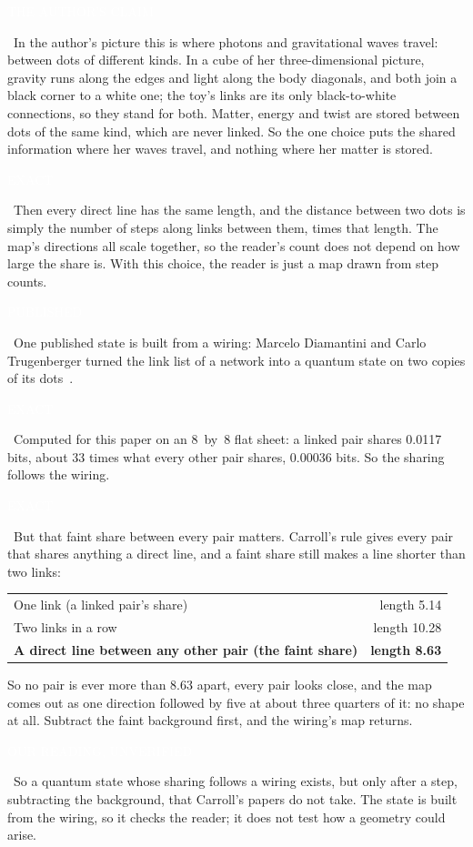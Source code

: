 \documentclass[11pt,letterpaper]{article}
\newcommand{\sub}[1]{\par\medskip{\color{ink}\large\bfseries #1}\par}
\newcommand{\tagbox}[2]{{\sffamily\scriptsize\colorbox{#1}{\textcolor{white}{\strut #2}}}}
\newcommand{\Exact}{\tagbox{kExact}{EXACT}}
\newcommand{\Pub}{\tagbox{kPub}{PUBLISHED}}
\newcommand{\Ours}{\tagbox{kOurs}{OUR READING, UNVERIFIED}}
\newcommand{\Claim}{\tagbox{kClaim}{THE AUTHOR'S CLAIM}}
\begin{document}
\Claim\ In the author's picture this is where photons and gravitational waves travel: between dots of different
kinds. In a cube of her three-dimensional picture, gravity runs along the edges and light along the body diagonals,
and both join a black corner to a white one; the toy's links are its only black-to-white connections, so they stand
for both. Matter, energy and twist are stored between dots of the same kind, which are never linked. So the one
choice puts the shared information where her waves travel, and nothing where her matter is stored.

\Exact\ Then every direct line has the same length, and the distance between two dots is simply the
number of steps along links between them, times that length. The map's directions all scale together,
so the reader's count does not depend on how large the share is. With this choice, the reader is just
a map drawn from step counts.

\sub{Does a quantum state like that exist?}
\Pub\ One published state is built from a wiring: Marcelo Diamantini and Carlo Trugenberger turned the
link list of a network into a quantum state on two copies of its dots~\cite{DT17}. \Exact\ Computed for
this paper on an 8~by~8 flat sheet: a linked pair shares 0.0117 bits, about 33 times what every other
pair shares, 0.00036 bits. So the sharing follows the wiring.

\Exact\ But that faint share between every pair matters. Carroll's rule gives every pair that shares
anything a direct line, and a faint share still makes a line shorter than two links:

\begin{center}
\renewcommand{\arraystretch}{1.15}
\begin{tabular}{lr}
\toprule
One link (a linked pair's share) & length 5.14 \\
Two links in a row & length 10.28 \\
\textbf{A direct line between any other pair (the faint share)} & \textbf{length 8.63} \\
\bottomrule
\end{tabular}
\end{center}

So no pair is ever more than 8.63 apart, every pair looks close, and the map comes out as one direction
followed by five at about three quarters of it: no shape at all. Subtract the faint background first, and the
wiring's map returns. \Ours\ So a quantum state whose sharing follows a wiring exists, but only after a
step, subtracting the background, that Carroll's papers do not take. The state is built from the wiring,
so it checks the reader; it does not test how a geometry could arise.
\end{document}
